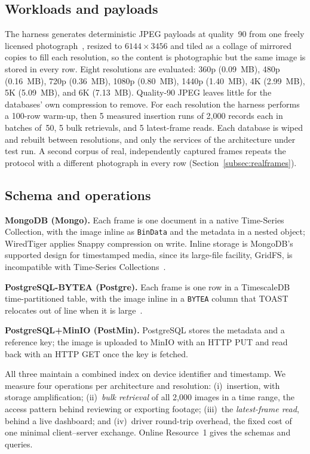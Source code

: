 \documentclass[pdflatex,sn-basic]{sn-jnl}%
\begin{document}
\subsection{Workloads and payloads}\label{subsec:workloads}
The harness generates deterministic JPEG payloads at quality~90 from one freely licensed photograph~\citep{pexels_durdle_door}, resized to $6144\times3456$ and tiled as a collage of mirrored copies to fill each resolution, so the content is photographic but the same image is stored in every row. Eight resolutions are evaluated: 360p (0.09~MB), 480p (0.16~MB), 720p (0.36~MB), 1080p (0.80~MB), 1440p (1.40~MB), 4K (2.99~MB), 5K (5.09~MB), and 6K (7.13~MB). Quality-90 JPEG leaves little for the databases' own compression to remove. For each resolution the harness performs a 100-row warm-up, then 5 measured insertion runs of 2{,}000 records each in batches of~50, 5 bulk retrievals, and 5 latest-frame reads. Each database is wiped and rebuilt between resolutions, and only the services of the architecture under test run. A second corpus of real, independently captured frames repeats the protocol with a different photograph in every row (Section~\ref{subsec:realframes}).

\subsection{Schema and operations}\label{subsec:schema}
\textbf{MongoDB (Mongo).} Each frame is one document in a native Time-Series Collection, with the image inline as \texttt{BinData} and the metadata in a nested object; WiredTiger applies Snappy compression on write. Inline storage is MongoDB's supported design for timestamped media, since its large-file facility, GridFS, is incompatible with Time-Series Collections~\citep{mongodb_ts_limitations}.

\textbf{PostgreSQL-BYTEA (Postgre).} Each frame is one row in a TimescaleDB time-partitioned table, with the image inline in a \texttt{BYTEA} column that TOAST relocates out of line when it is large~\citep{postgresql_toast_docs}.

\textbf{PostgreSQL+MinIO (PostMin).} PostgreSQL stores the metadata and a reference key; the image is uploaded to MinIO with an HTTP PUT and read back with an HTTP GET once the key is fetched.

All three maintain a combined index on device identifier and timestamp. We measure four operations per architecture and resolution: (i)~insertion, with storage amplification; (ii)~\emph{bulk retrieval} of all 2{,}000 images in a time range, the access pattern behind reviewing or exporting footage; (iii)~the \emph{latest-frame read}, behind a live dashboard; and (iv)~driver round-trip overhead, the fixed cost of one minimal client--server exchange. Online Resource~1 gives the schemas and queries.
\end{document}
